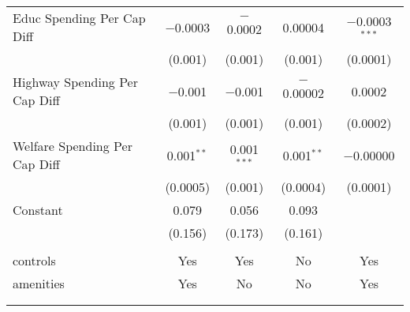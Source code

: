 \begin{table}[!htbp]
\begin{tabular}{@{\extracolsep{5pt}}lcccc}
  Educ Spending Per Cap Diff & $-$0.0003 & $-$0.0002 & 0.00004 & $-$0.0003$^{***}$ \\ 
  & (0.001) & (0.001) & (0.001) & (0.0001) \\ 
  Highway Spending Per Cap Diff & $-$0.001 & $-$0.001 & $-$0.00002 & 0.0002 \\ 
  & (0.001) & (0.001) & (0.001) & (0.0002) \\ 
  Welfare Spending Per Cap Diff & 0.001$^{**}$ & 0.001$^{***}$ & 0.001$^{**}$ & $-$0.00000 \\ 
  & (0.0005) & (0.001) & (0.0004) & (0.0001) \\ 
  Constant & 0.079 & 0.056 & 0.093 &  \\ 
  & (0.156) & (0.173) & (0.161) &  \\ 
 \hline \\[-1.8ex] 
controls & Yes & Yes & No & Yes \\ 
amenities & Yes & No & No & Yes \\ 
\hline \\[-1.8ex] 
\hline 
\hline \\[-1.8ex] 
\end{tabular} 
\end{table} 
